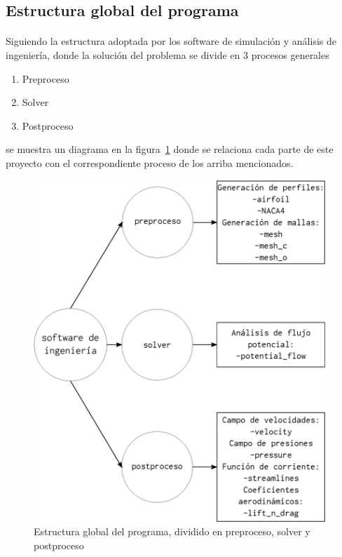 \documentclass[letterpaper, openright, 12pt]{book}
\begin{document}
    \subsection{Estructura global del programa}
    \paragraph*{}
        Siguiendo la estructura adoptada por los software de simulación y
        análisis de ingeniería, donde la solución del problema se divide en 3
        procesos generales
        \begin{enumerate}
            \item Preproceso
            \item Solver
            \item Postproceso
        \end{enumerate}
        se muestra un diagrama en la figura~\ref{estructura_global} donde se
        relaciona cada parte de este proyecto con el correspondiente proceso de
        los arriba mencionados.

    \begin{figure}[htbp!]
        \centering
        \includegraphics[keepaspectratio, width=110mm]{./Imagenes/estructura_global}
        \caption[Estructura global del programa]{Estructura global del programa,
        dividido en preproceso, solver y postproceso}
        \label{estructura_global}
    \end{figure}
\end{document}
